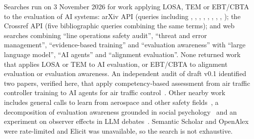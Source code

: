 \documentclass[11pt]{article}
\begin{document}
{\raggedright
Searches run on 3 November 2026 for work applying LOSA, TEM or EBT/CBTA to the evaluation of AI systems: arXiv API (queries including , , , , , , , , ); the Crossref API (five bibliographic queries combining the same terms); and web searches combining ``line operations safety audit'', ``threat and error management'', ``evidence-based training'' and ``evaluation awareness'' with ``large language model'', ``AI agents'' and ``alignment evaluation''. None returned work that applies LOSA or TEM to AI evaluation, or EBT/CBTA to alignment evaluation or evaluation awareness. An independent audit of draft v0.1 identified two papers, verified here, that apply competency-based assessment from air traffic controller training to AI agents for air traffic control~\cite{carvell2026,pepper2026}. Other nearby work includes general calls to learn from aerospace and other safety fields~\cite{weidinger2025}, a decomposition of evaluation awareness grounded in social psychology~\cite{li2026} and an experiment on observer effects in LLM debates~\cite{covas2026}. Semantic Scholar and OpenAlex were rate-limited and Elicit was unavailable, so the search is not exhaustive.
\par}
\end{document}

